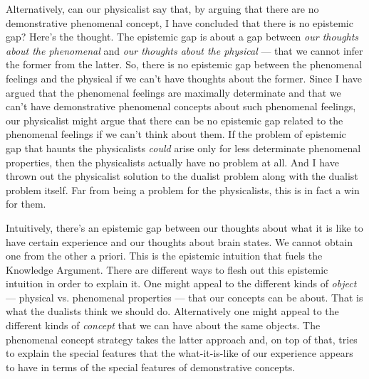 \documentclass[a4paper,12pt]{article}
\begin{document}
Alternatively, can our physicalist say that, by arguing that there are no demonstrative phenomenal concept, I have concluded that there is no epistemic gap? Here's the thought. The epistemic gap is about a gap between \emph{our thoughts about the phenomenal} and \emph{our thoughts about the physical} --- that we cannot infer the former from the latter. So, there is no epistemic gap between the phenomenal feelings and the physical if we can't have thoughts about the former. Since I have argued that the phenomenal feelings are maximally determinate and that we can't have demonstrative phenomenal concepts about such phenomenal feelings, our physicalist might argue that there can be no epistemic gap related to the phenomenal feelings if we can't think about them. If the problem of epistemic gap that haunts the physicalists \emph{could} arise only for less determinate phenomenal properties, then the physicalists actually have no problem at all. And I have thrown out the physicalist solution to the dualist problem along with the dualist problem itself. Far from being a problem for the physicalists, this is in fact a win for them.

Intuitively, there's an epistemic gap between our thoughts about what it is like to have certain experience and our thoughts about brain states. We cannot obtain one from the other a priori. This is the epistemic intuition that fuels the Knowledge Argument. There are different ways to flesh out this epistemic intuition in order to explain it. One might appeal to the different kinds of \emph{object} --- physical vs. phenomenal properties --- that our concepts can be about. That is what the dualists think we should do. Alternatively one might appeal to the different kinds of \emph{concept} that we can have about the same objects. The phenomenal concept strategy takes the latter approach and, on top of that, tries to explain the special features that the what-it-is-like of our experience appears to have in terms of the special features of demonstrative concepts. 
\end{document}

